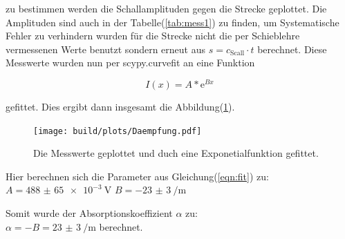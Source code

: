         \noindent zu bestimmen werden die Schallamplituden gegen die Strecke geplottet. Die Amplituden sind auch in der 
        Tabelle(\ref{tab:mess1}) zu finden, um Systematische Fehler zu verhindern wurden für die Strecke nicht die per Schieblehre vermessenen 
        Werte benutzt sondern erneut aus $s = c_{\text{Scall}}\cdot t$ berechnet. Diese Messwerte wurden nun per scypy.curvefit \cite{scipy}
        an eine Funktion

        \begin{equation*}
            I(x) = A * \text{e}^{B x}
            \label{eqn:fit}
        \end{equation*}

        \noindent gefittet. Dies ergibt dann insgesamt die Abbildung(\ref{img:py_daem}).

        \begin{figure}[ht]
            \centering
            \texttt{[image: build/plots/Daempfung.pdf]}
            \caption{Die Messwerte geplottet und duch eine Exponetialfunktion gefittet.}
            \label{img:py_daem}
        \end{figure}

        \noindent Hier berechnen sich die Parameter aus Gleichung(\ref{eqn:fit}) zu: \newline
        $A = \SI{488(65)e-3}{\volt}$ \newline
        $B = \SI{-23(3)}{\per\metre}$
        
        \noindent Somit wurde der Absorptionskoeffizient $\alpha$ zu:\\
        $\alpha = -B = \SI{23(3)}{\per\metre} $
        berechnet.


